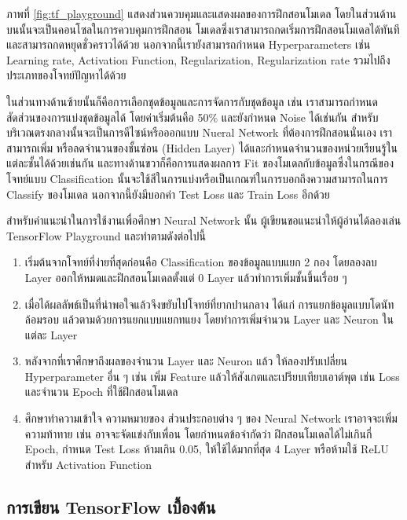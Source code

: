 ภาพที่ \ref{fig:tf_playground} แสดงส่วนควบคุมและแสดงผลของการฝึกสอนโมเดล โดยในส่วนด้านบนนั้นจะเป็นคอนโซลในการควบคุมการฝึกสอน%
โมเดลซึ่งเราสามารถกดเริ่มการฝึกสอนโมเดลได้ทันที และสามารถกดหยุดชั่วคราวได้ด้วย นอกจากนี้เรายังสามารถกำหนด Hyperparameters เช่น 
Learning rate, Activation Function, Regularization, Regularization rate รวมไปถึงประเภทของโจทย์ปัญหาได้ด้วย

ในส่วนทางด้านซ้ายนั้นก็คือการเลือกชุดข้อมูลและการจัดการกับชุดข้อมูล เช่น เราสามารถกำหนดสัดส่วนของการแบ่งชุดข้อมูลได้ โดยค่าเริ่มต้นคือ 50\%
และยังกำหนด Noise ได้เช่นกัน สำหรับบริเวณตรงกลางนั้นจะเป็นการดีไซน์หรือออกแบบ Nueral Network ที่ต้องการฝึกสอนนั่นเอง เราสามารถเพิ่ม%
หรือลดจำนวนของชั้นซ่อน (Hidden Layer) ได้และกำหนดจำนวนของหน่วยเรียนรู้ในแต่ละชั้นได้ด้วยเช่นกัน และทางด้านขวาก็คือการแสดงผลการ Fit 
ของโมเดลกับข้อมูลซึ่งในกรณีของโจทย์แบบ Classification นั้นจะใช้สีในการแบ่งหรือเป็นเกณฑ์ในการบอกถึงความสามารถในการ Classify ของโมเดล
นอกจากนี้ยังมีบอกค่า Test Loss และ Train Loss อีกด้วย

สำหรับคำแนะนำในการใช้งานเพื่อศึกษา Neural Network นั้น ผู้เขียนขอแนะนำให้ผู้อ่านได้ลองเล่น TensorFlow Playground และทำตามดังต่อไปนี้

\begin{enumerate}
    \item เริ่มต้นจากโจทย์ที่ง่ายที่สุดก่อนคือ Classification ของข้อมูลแบบแยก 2 กอง โดยลองลบ Layer ออกให้หมดและฝึกสอนโมเดลตั้งแต่ 
    0 Layer แล้วทำการเพิ่มชั้นขึ้นเรื่อย ๆ 
    
    \item เมื่อได้ผลลัพธ์เป็นที่น่าพอใจแล้วจึงขยับไปโจทย์ที่ยากปานกลาง ได้แก่ การแยกข้อมูลแบบโดนัทล้อมรอบ แล้วตามด้วยการแยกแบบแยกทแยง 
    โดยทำการเพิ่มจำนวน Layer และ Neuron ในแต่ละ Layer 
    
    \item หลังจากที่เราศึกษาถึงผลของจำนวน Layer และ Neuron แล้ว ให้ลองปรับเปลี่ยน Hyperparameter อื่น ๆ เช่น เพิ่ม Feature 
    แล้วให้สังเกตและเปรียบเทียบเอาต์พุต เช่น Loss และจำนวน Epoch ที่ใช้ฝึกสอนโมเดล
    
    \item ศึกษาทำความเข้าใจ ความหมายของ ส่วนประกอบต่าง ๆ ของ Neural Network เราอาจจะเพิ่มความท้าทาย เช่น อาจจะจัดแข่งกับเพื่อน%
    โดยกำหนดข้อจำกัดว่า ฝึกสอนโมเดลได้ไม่เกินกี่ Epoch, กำหนด Test Loss ห้ามเกิน 0.05, ให้ใช้ได้มากที่สุด 4 Layer หรือห้ามใช้ ReLU 
    สำหรับ Activation Function
\end{enumerate}

\subsection{การเขียน TensorFlow เบื้องต้น}


